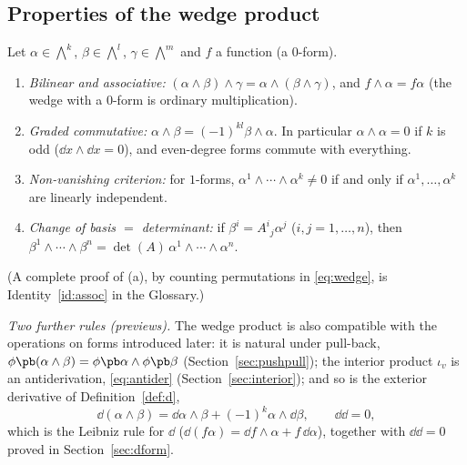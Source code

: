 \subsection{Properties of the wedge product}\label{sec:wedgeprops}

\begin{proposition}\label{prop:wedgeprops}
Let $\alpha\in\bigwedge^k$, $\beta\in\bigwedge^l$, $\gamma\in\bigwedge^m$ and $f$ a function (a $0$-form).
\begin{enumerate}[label=(\alph*)]
\item \emph{Bilinear and associative:} $(\alpha\wedge\beta)\wedge\gamma=\alpha\wedge(\beta\wedge\gamma)$, and $f\wedge\alpha=f\alpha$ (the wedge with a $0$-form is ordinary multiplication).
\item \emph{Graded commutative:} $\alpha\wedge\beta=(-1)^{kl}\beta\wedge\alpha$. In particular $\alpha\wedge\alpha=0$ if $k$ is odd (\eg $\dd x\wedge\dd x=0$), and even-degree forms commute with everything.
\item \emph{Non-vanishing criterion:} for $1$-forms, $\alpha^1\wedge\cdots\wedge\alpha^k\neq0$ if and only if $\alpha^1,\dots,\alpha^k$ are linearly independent.
\item \emph{Change of basis $=$ determinant:} if $\beta^i=A^i{}_j\alpha^j$ ($i,j=1,\dots,n$), then $\beta^1\wedge\cdots\wedge\beta^n=\det(A)\,\alpha^1\wedge\cdots\wedge\alpha^n$.
\end{enumerate}
\end{proposition}
(A complete proof of (a), by counting permutations in \eqref{eq:wedge}, is Identity~\ref{id:assoc} in the Glossary.)

\emph{Two further rules (previews).} The wedge product is also compatible with the operations on forms introduced later:
it is natural under pull-back, $\phi\pb(\alpha\wedge\beta)=\phi\pb\alpha\wedge\phi\pb\beta$ (Section~\ref{sec:pushpull}); the interior
product $\iota_v$ is an antiderivation, \eqref{eq:antider} (Section~\ref{sec:interior}); and so is the exterior derivative of
Definition~\ref{def:d},
\begin{equation}\label{eq:dleibniz}
\dd(\alpha\wedge\beta)=\dd\alpha\wedge\beta+(-1)^k\alpha\wedge\dd\beta,\qquad \dd\dd=0,
\end{equation}
which is the Leibniz rule for $\dd$ (\eg $\dd(f\alpha)=\dd f\wedge\alpha+f\,\dd\alpha$), together with $\dd\dd=0$ proved in
Section~\ref{sec:dform}.

